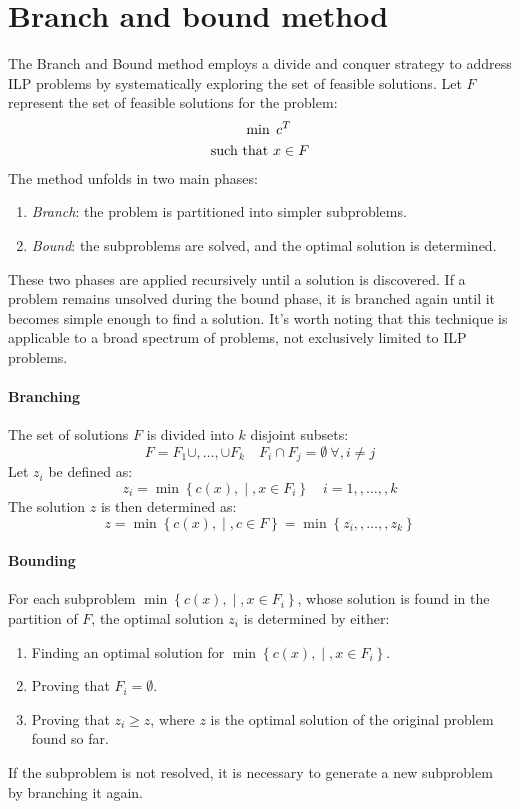 \section{Branch and bound method}
The Branch and Bound method employs a divide and conquer strategy to address ILP problems by systematically exploring the set of feasible solutions.
Let $F$ represent the set of feasible solutions for the problem:
\begin{align*}
    \min                    \:&\: c^T     \\
    \textnormal{such that }   &   x \in F \\
\end{align*}
The method unfolds in two main phases:
\begin{enumerate}
    \item \textit{Branch}: the problem is partitioned into simpler subproblems.
    \item \textit{Bound}: the subproblems are solved, and the optimal solution is determined.
\end{enumerate}
These two phases are applied recursively until a solution is discovered. 
If a problem remains unsolved during the bound phase, it is branched again until it becomes simple enough to find a solution. 
It's worth noting that this technique is applicable to a broad spectrum of problems, not exclusively limited to ILP problems.

\paragraph*{Branching}
The set of solutions $F$ is divided into $k$ disjoint subsets:
\[ F = F_1 \cup,  \ldots,  \cup F_k \quad F_i \cap F_j = \emptyset \: \forall,  i \neq j \]
Let $z_i$ be defined as:
\[ z_i = \min\left\{ c(x), \middle\vert, x \in F_i \right\} \quad i = 1,,  \ldots,  , k \]
The solution $z$ is then determined as:
\[ z = \min\left\{ c(x), \middle\vert, c \in F \right\} = \min\left\{ z_i,,  \ldots, , z_k \right\} \]

\paragraph*{Bounding}
For each subproblem $\min\left\{ c(x), \middle\vert, x \in F_i \right\}$, whose solution is found in the partition of $F$, the optimal solution $z_i$ is determined by either:
\begin{enumerate}
    \item Finding an optimal solution for $\min\left\{ c(x), \middle\vert, x \in F_i \right\}$.
    \item Proving that $F_i = \emptyset$.
    \item Proving that $z_i \geq z$, where $z$ is the optimal solution of the original problem found so far.
\end{enumerate}
If the subproblem is not resolved, it is necessary to generate a new subproblem by branching it again.


